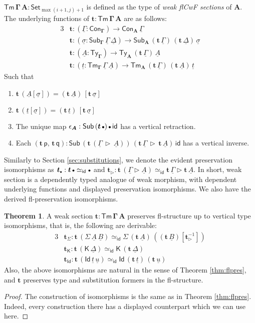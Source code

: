 \documentclass{article}
\theoremstyle{definition}
\theoremstyle{theorem}
\newtheorem{theorem}{Theorem}
\newcommand{\id}{\mathsf{id}}
\newcommand{\Con}{\mathsf{Con}}
\newcommand{\Sub}{\mathsf{Sub}}
\newcommand{\Tm}{\mathsf{Tm}}
\newcommand{\Ty}{\mathsf{Ty}}
\newcommand{\Id}{\mathsf{Id}}
\newcommand{\ra}{\rightarrow}
\newcommand{\Set}{\mathsf{Set}}
\newcommand{\ext}{\triangleright}
\newcommand{\emptycon}{\scaleobj{.75}\bullet}
\newcommand{\p}{\mathsf{p}}
\newcommand{\q}{\mathsf{q}}
\newcommand{\K}{\mathsf{K}}
\newcommand{\bTm}{\boldsymbol{\Tm}}
\newcommand{\bGamma}{\boldsymbol{\Gamma}}
\newcommand{\bt}{\boldsymbol{t}}
\newcommand{\bA}{\boldsymbol{A}}
\newcommand{\ul}[1]{\underline{#1}}
\newcommand{\ulGamma}{\ul{\Gamma}}
\newcommand{\ulDelta}{\ul{\Delta}}
\newcommand{\ulsigma}{\ul{\sigma}}
\newcommand{\ult}{\ul{t}}
\newcommand{\ulu}{\ul{u}}
\newcommand{\ulA}{\ul{A}}
\newcommand{\ulB}{\ul{B}}
\begin{document}
$\boldsymbol{\Tm\,\Gamma\,A} : \Set_{\max(i+1, j)+1}$ is defined as the type of
\emph{weak flCwF sections} of $\bA$. The underlying functions of $\bt :
\bTm\,\bGamma\,\bA$ are as follows:
\begin{alignat*}{3}
  & \bt : (\ulGamma : \Con_{\bGamma}) \ra \Con_{\bA}\,\ulGamma\\
  & \bt : (\ulsigma : \Sub_{\bGamma}\,\ulGamma\,\ulDelta)
         \ra \Sub_{\bA}\,(\bt\,\ulGamma)\,(\bt\,\ulDelta)\,\ulsigma\\
  & \bt : (\ulA : \Ty_{\bGamma}) \ra \Ty_{\bA}\,(\bt\,\ulGamma)\,\ulA\\
  & \bt : (\ult : \Tm_{\bGamma}\,\ulGamma\,\ulA) \ra
          \Tm_{\bA}\,(\bt\,\ulGamma)\,(\bt\,\ulA)\,\ult
\end{alignat*}
Such that
\begin{enumerate}
  \item $\bt\,(\ulA[\ulsigma]) = (\bt\,\ulA)\,[\bt\,\ulsigma]$
  \item $\bt\,(\ult[\ulsigma]) = (\bt\,\ult)\,[\bt\,\ulsigma]$
  \item The unique map $\epsilon_{\bA} : \Sub\,(\bt\,\emptycon)\,\emptycon\,\id$ has a vertical retraction.
  \item Each $(\bt\,\p,\,\bt\,\q) : \Sub\,(\bt\,(\ulGamma\,\ext\,\ulA))\,(\bt\,\ulGamma\,\ext\,\bt\,\ulA)\,\id$ has a vertical inverse.
\end{enumerate}

Similarly to Section \ref{sec:substitutions}, we denote the evident preservation
isomorphisms as $\bt_{\emptycon} : \bt\,\emptycon \simeq_{\id} \emptycon$ and
$\bt_{\ext} : \bt\,(\ulGamma\ext \ulA) \simeq_{\id} \bt\,\ulGamma \ext
\bt\,\ulA$. In short, weak section is a dependently typed analogue of weak
morphism, with dependent underlying functions and displayed preservation
isomorphisms. We also have the derived fl-preservation isomorphisms.

\begin{theorem} A weak section $\boldsymbol{t : \Tm\,\Gamma\,A}$ preserves fl-structure up to vertical type isomorphisms, that is, the following are derivable:
\begin{alignat*}{3}
  & \bt_{\Sigma} : \bt\,(\Sigma\,\ulA\,\ulB) \simeq_{\id} \Sigma\,(\bt\,\ulA)\,((\bt\,\ulB)[\bt_{\ext}^{-1}]) \\
  & \bt_{\K} : \bt\,(\K\,\ulDelta) \simeq_{\id} \K\,(\bt\,\ulDelta) \\
  & \bt_{\Id} : \bt\,(\Id\,\ult\,\ulu) \simeq_{\id} \Id\,(\bt\,\ult)\,(\bt\,\ulu)
\end{alignat*}
Also, the above isomorphisms are natural in the sense of Theorem
\ref{thm:flpres}, and $\bt$ preserves type and substitution formers in the
fl-structure.
\end{theorem}
\begin{proof}
The construction of isomorphisms is the same as in Theorem
\ref{thm:flpres}. Indeed, every construction there has a displayed counterpart
which we can use here.
\end{proof}
\end{document}
